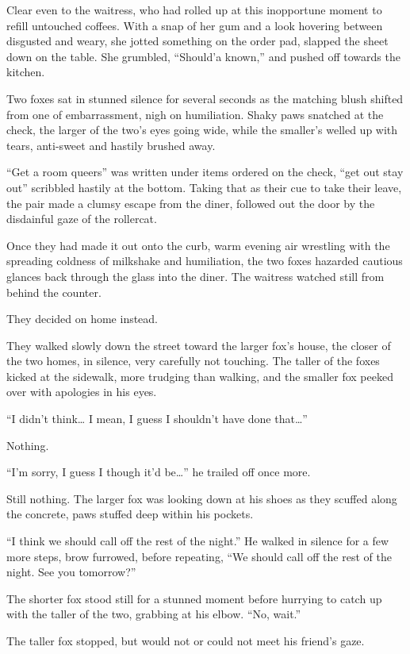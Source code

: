 Clear even to the waitress, who had rolled up at this inopportune moment to refill untouched coffees. With a snap of her gum and a look hovering between disgusted and weary, she jotted something on the order pad, slapped the sheet down on the table. She grumbled, ``Should'a known,'' and pushed off towards the kitchen.

Two foxes sat in stunned silence for several seconds as the matching blush shifted from one of embarrassment, nigh on humiliation. Shaky paws snatched at the check, the larger of the two's eyes going wide, while the smaller's welled up with tears, anti-sweet and hastily brushed away.

``Get a room queers'' was written under items ordered on the check, ``get out stay out'' scribbled hastily at the bottom. Taking that as their cue to take their leave, the pair made a clumsy escape from the diner, followed out the door by the disdainful gaze of the rollercat.

Once they had made it out onto the curb, warm evening air wrestling with the spreading coldness of milkshake and humiliation, the two foxes hazarded cautious glances back through the glass into the diner. The waitress watched still from behind the counter.

They decided on home instead.

They walked slowly down the street toward the larger fox's house, the closer of the two homes, in silence, very carefully not touching. The taller of the foxes kicked at the sidewalk, more trudging than walking, and the smaller fox peeked over with apologies in his eyes.

``I didn't think\ldots{} I mean, I guess I shouldn't have done that\ldots{}''

Nothing.

``I'm sorry, I guess I though it'd be\ldots{}'' he trailed off once more.

Still nothing. The larger fox was looking down at his shoes as they scuffed along the concrete, paws stuffed deep within his pockets.

``I think we should call off the rest of the night.'' He walked in silence for a few more steps, brow furrowed, before repeating, ``We should call off the rest of the night. See you tomorrow?''

The shorter fox stood still for a stunned moment before hurrying to catch up with the taller of the two, grabbing at his elbow. ``No, wait.''

The taller fox stopped, but would not or could not meet his friend's gaze.

